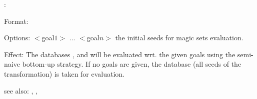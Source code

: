 :

Format: 

Options: $<$goal$1>$ ... $<$goal$n>$ the initial seeds for magic sets evaluation.

Effect: The databases  , and  will be 
	evaluated wrt. the given goals using the semi-naive bottom-up strategy. 
	If no goals are given, the database  (all seeds of 
        the transformation) is taken for evaluation.   

see also: , ,  

